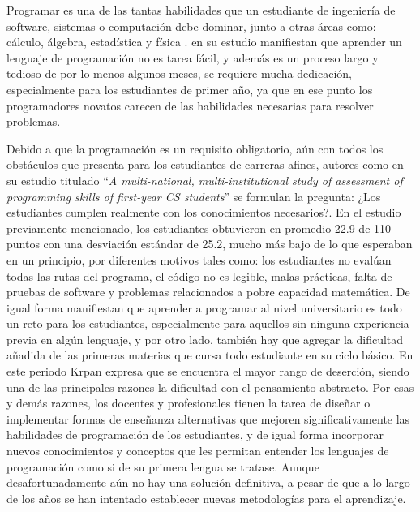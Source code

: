 Programar es una de las tantas habilidades que un estudiante de ingeniería de software, sistemas o computación debe dominar, junto a otras áreas como: cálculo, álgebra, estadística y física \parencite{Ozmen2014}. \textcite{Tan2009} en su estudio manifiestan que aprender un lenguaje de programación no es tarea fácil, y además es un proceso largo y tedioso de por lo menos algunos meses, se requiere mucha dedicación, especialmente para los estudiantes de primer año, ya que en ese punto los programadores novatos carecen de las habilidades necesarias para resolver problemas.

Debido a que la programación es un requisito obligatorio, aún con todos los obstáculos que presenta para los estudiantes de carreras afines, autores como \textcite{McCracken2001} en su estudio titulado ``\textit{A multi-national, multi-institutional study of assessment of programming skills of first-year CS students}'' se formulan la pregunta: ¿Los estudiantes cumplen realmente con los conocimientos necesarios?. En el estudio previamente mencionado, los estudiantes obtuvieron en promedio 22.9 de 110 puntos con una desviación estándar de 25.2, mucho más bajo de lo que esperaban en un principio, por diferentes motivos tales como: los estudiantes no evalúan todas las rutas del programa, el código no es legible, malas prácticas, falta de pruebas de software y problemas relacionados a pobre capacidad matemática. De igual forma \textcite{Krpan2015} manifiestan que aprender a programar al nivel universitario es todo un reto para los estudiantes, especialmente para aquellos sin ninguna experiencia previa en algún lenguaje, y por otro lado, también hay que agregar la dificultad añadida de las primeras materias que cursa todo estudiante en su ciclo básico. En este periodo Krpan expresa que se encuentra el mayor rango de deserción, siendo una de las principales razones la dificultad con el pensamiento abstracto. Por esas y demás razones, los docentes y profesionales tienen la tarea de diseñar o implementar formas de enseñanza alternativas que mejoren significativamente las habilidades de programación de los estudiantes, y de igual forma incorporar nuevos conocimientos y conceptos que les permitan entender los lenguajes de programación como si de su primera lengua se tratase. Aunque desafortunadamente aún no hay una solución definitiva, a pesar de que a lo largo de los años se han intentado establecer nuevas metodologías para el aprendizaje.

